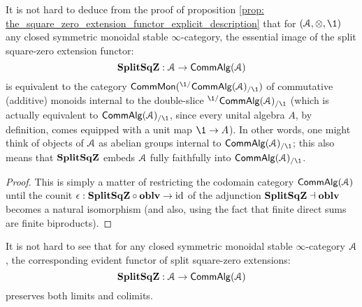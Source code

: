                 \begin{corollary} \label{coro: internal_abelian_groups}
                    It is not hard to deduce from the proof of proposition \ref{prop: the_square_zero_extension_functor_explicit_description} that for $(\calA, \tensor, \1)$ any closed symmetric monoidal stable $\infty$-category, the essential image of the split square-zero extension functor:
                        $$\mathbf{Split}\mathbf{Sq}\mathbf{Z}: \mathcal{A} \to \mathsf{Comm}\mathsf{Alg}(\mathcal{A})$$
                    is equivalent to the category $\Comm\Mon( {}^{\1/}\Comm\Alg(\calA)_{/\1} )$ of commutative (additive) monoids internal to the double-slice ${}^{\1/}\Comm\Alg(\calA)_{/\1}$ (which is actually equivalent to $\Comm\Alg(\calA)_{/\1}$, since every unital algebra $A$, by definition, comes equipped with a unit map $\1 \to A$). In other words, one might think of objects of $\mathcal{A}$ as abelian groups internal to $\Comm\Alg(\calA)_{/\1}$; this also means that $\mathbf{Split}\mathbf{Sq}\mathbf{Z}$ embeds $\mathcal{A}$ fully faithfully into $\Comm\Alg(\calA)_{/\1}$.
                \end{corollary}
                    \begin{proof}
                        This is simply a matter of restricting the codomain category $\mathsf{Comm}\mathsf{Alg}(\mathcal{A})$ until the counit $\epsilon: \mathbf{Split}\mathbf{Sq}\mathbf{Z} \circ \mathbf{oblv} \to \mathrm{id}$ of the adjunction $\mathbf{Split}\mathbf{Sq}\mathbf{Z} \dashv \mathbf{oblv}$ becomes a natural isomorphism (and also, using the fact that finite direct sums are finite biproducts).
                    \end{proof}
                \begin{remark} \label{remark: square_zero_extension_functor_preserves_(co)limits}
                    It is not hard to see that for any closed symmetric monoidal stable $\infty$-category $\mathcal{A}$, the corresponding evident functor of split square-zero extensions:
                        $$\mathbf{Split}\mathbf{Sq}\mathbf{Z}: \mathcal{A} \to \mathsf{Comm}\mathsf{Alg}(\mathcal{A})$$
                    preserves both limits and colimits.
                \end{remark}
                
